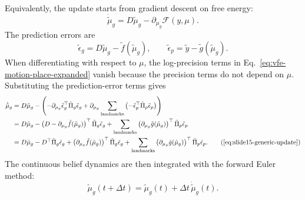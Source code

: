 Equivalently, the update starts from gradient descent on free energy:
\begin{equation}
    \dot{\tilde{\mu}}_{g}
    =
    D\tilde{\mu}_{g}
    -
    \partial_{\mu_g}\mathcal{F}(y,\mu).
    \label{eq:appendix-slide15-start}
\end{equation}
The prediction errors are
\begin{equation}
    \tilde{\epsilon}_{g}
    =
    D\tilde{\mu}_{g}
    -
    \tilde{f}(\tilde{\mu}_{g}),
    \qquad
    \tilde{\epsilon}_{p}
    =
    \tilde{y}
    -
    \tilde{g}(\tilde{\mu}_{g}).
    \label{eq:appendix-slide15-errors}
\end{equation}
When differentiating with respect to $\mu$, the log-precision terms in Eq.~\ref{eq:vfe-motion-place-expanded} vanish because the precision terms do not depend on $\mu$. Substituting the prediction-error terms gives
\begin{align}
    \dot{\tilde{\mu}}_{g}
    &=
    D\tilde{\mu}_{g}
    -
    \left(
        -
        \partial_{\mu_g}\tilde{\epsilon}_{g}^{\top}
        \tilde{\Pi}_{g}\tilde{\epsilon}_{g}
        +
        \partial_{\mu_g}
        \sum_{\mathrm{landmarks}}
        \left(
            -
            \tilde{\epsilon}_{p}^{\top}
            \tilde{\Pi}_{p}\tilde{\epsilon}_{p}
        \right)
    \right)
    \nonumber \\
    &=
    D\tilde{\mu}_{g}
    -
    \left(
        D
        -
        \partial_{\mu_g}\tilde{f}(\tilde{\mu}_{g})
    \right)^\top
    \tilde{\Pi}_{g}\tilde{\epsilon}_{g}
    +
    \sum_{\mathrm{landmarks}}
    \left(
        \partial_{\mu_g}\tilde{g}(\tilde{\mu}_{g})
    \right)^\top
    \tilde{\Pi}_{p}\tilde{\epsilon}_{p}
    \nonumber \\
    &=
    D\tilde{\mu}_{g}
    -
    D^\top\tilde{\Pi}_{g}\tilde{\epsilon}_{g}
    +
    \left(
        \partial_{\mu_g}\tilde{f}(\tilde{\mu}_{g})
    \right)^\top
    \tilde{\Pi}_{g}\tilde{\epsilon}_{g}
    +
    \sum_{\mathrm{landmarks}}
    \left(
        \partial_{\mu_g}\tilde{g}(\tilde{\mu}_{g})
    \right)^\top
    \tilde{\Pi}_{p}\tilde{\epsilon}_{p}.
    \tag{\ref{eq:slide15-generic-update}}
    \label{eq:appendix-slide15-derivation}
\end{align}
The continuous belief dynamics are then integrated with the forward Euler method:
\begin{equation}
    \tilde{\mu}_{g}(t+\Delta t)
    =
    \tilde{\mu}_{g}(t)
    +
    \Delta t\,
    \dot{\tilde{\mu}}_{g}(t).
    \label{eq:appendix-slide15-euler}
\end{equation}

